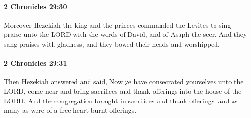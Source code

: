 		\paragraph{2 Chronicles 29:30} %
			\label{2CHRONICLES-29-30}

			Moreover Hezekiah the king and the princes commanded the Levites to sing praise unto the LORD with the words of David, and of Asaph the seer. And they sang praises with gladness, and they bowed their heads and worshipped.


		\paragraph{2 Chronicles 29:31} %
			\label{2CHRONICLES-29-31}

			Then Hezekiah answered and said, Now ye have consecrated yourselves unto the LORD, come near and bring sacrifices and thank offerings into the house of the LORD. And the congregation brought in sacrifices and thank offerings; and as many as were of a free heart burnt offerings.

